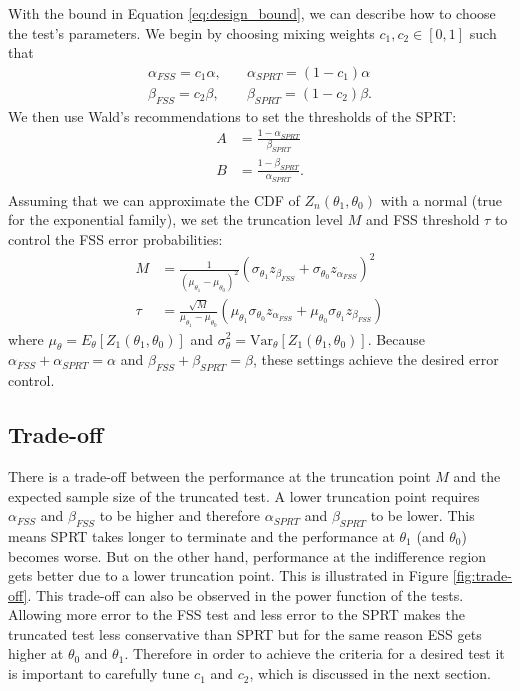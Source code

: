 \documentclass[11pt]{article}
\begin{document}
With the bound in Equation \ref{eq:design_bound}, we can describe how to choose the test's parameters. We begin by choosing mixing weights $c_1, c_2 \in \left[0, 1\right]$ such that
\begin{equation}
\begin{split}
\alpha_{FSS} = c_1 \alpha, \quad &\alpha_{SPRT} = (1 - c_1) \alpha \\
\beta_{FSS} = c_2 \beta, \quad &\beta_{SPRT} = (1 - c_2) \beta.
\end{split}
\end{equation}
We then use Wald's recommendations to set the thresholds of the SPRT:
\begin{equation}
\begin{split}
A &= \frac{1 - \alpha_{SPRT}}{\beta_{SPRT}} \\
B &= \frac{1 - \beta_{SPRT}}{\alpha_{SPRT}}. \\
\end{split}
\end{equation}
Assuming that we can approximate the CDF of $Z_n(\theta_1, \theta_0)$ with a normal (true for the exponential family), we set the truncation level $M$ and FSS threshold $\tau$ to control the FSS error probabilities:
\begin{equation}
\begin{split}
M &= \frac{1}{(\mu_{\theta_1} - \mu_{\theta_0})^2} \left(\sigma_{\theta_1} z_{\beta_{FSS}} + \sigma_{\theta_0}z_{\alpha_{FSS}}\right)^2 \\
\tau &= \frac{\sqrt{M}}{\mu_{\theta_1} - \mu_{\theta_0}} \left(\mu_{\theta_1} \sigma_{\theta_0} z_{\alpha_{FSS}} + \mu_{\theta_0} \sigma_{\theta_1} z_{\beta_{FSS}}\right)
\end{split}
\end{equation}
where $\mu_{\theta} = E_{\theta}\left[Z_1(\theta_1, \theta_0)\right]$ and $\sigma^2_{\theta} = \text{Var}_{\theta}\left[Z_1(\theta_1, \theta_0)\right]$. Because $\alpha_{FSS} + \alpha_{SPRT} = \alpha$ and $\beta_{FSS} + \beta_{SPRT} = \beta$, these settings achieve the desired error control.

\subsection{Trade-off}

There is a trade-off between the performance at the truncation point $M$ and the expected sample size of the truncated test. A lower truncation point requires $\alpha_{FSS}$ and $\beta_{FSS}$ to be higher and therefore $\alpha_{SPRT}$ and $\beta_{SPRT}$ to be lower. This means SPRT takes longer to terminate and the performance at $\theta_1$ (and $\theta_0$) becomes worse. But on the other hand, performance at the indifference region gets better due to a lower truncation point. This is illustrated in Figure \ref{fig:trade-off}. This trade-off can also be observed in the power function of the tests. Allowing more error to the FSS test and less error to the SPRT makes the truncated test less conservative than SPRT but for the same reason ESS gets higher at $\theta_0$ and $\theta_1$. Therefore in order to achieve the criteria for a desired test it is important to carefully tune $c_1$ and $c_2$, which is discussed in the next section.
\end{document}
